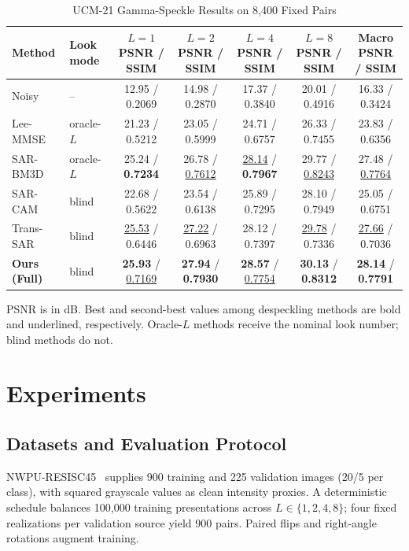 \documentclass[journal]{IEEEtran}
\begin{document}
\begin{table}[!b]
\caption{UCM-21 Gamma-Speckle Results on 8,400 Fixed Pairs}
\label{tab:main}
\centering
\footnotesize
\setlength{\tabcolsep}{3.2pt}
\renewcommand{\arraystretch}{1.08}
\begin{tabular*}{0.86\textwidth}{@{\extracolsep{\fill}}llccccc@{}}
\toprule
\textbf{Method} & \textbf{Look mode} &
\shortstack{\(L=1\)\\PSNR / SSIM} &
\shortstack{\(L=2\)\\PSNR / SSIM} &
\shortstack{\(L=4\)\\PSNR / SSIM} &
\shortstack{\(L=8\)\\PSNR / SSIM} &
\shortstack{Macro\\PSNR / SSIM} \\
\midrule
Noisy       & --                & 12.95 / 0.2069 & 14.98 / 0.2870 & 17.37 / 0.3840 & 20.01 / 0.4916 & 16.33 / 0.3424 \\
Lee-MMSE    & oracle-\(L\)      & 21.23 / 0.5212 & 23.05 / 0.5999 & 24.71 / 0.6757 & 26.33 / 0.7455 & 23.83 / 0.6356 \\
SAR-BM3D    & oracle-\(L\)      & 25.24 / \textbf{0.7234} & 26.78 / \underline{0.7612} & \underline{28.14} / \textbf{0.7967} & 29.77 / \underline{0.8243} & 27.48 / \underline{0.7764} \\
SAR-CAM     & blind             & 22.68 / 0.5622 & 23.54 / 0.6138 & 25.89 / 0.7295 & 28.10 / 0.7949 & 25.05 / 0.6751 \\
Trans-SAR   & blind             & \underline{25.53} / 0.6446 & \underline{27.22} / 0.6963 & 28.12 / 0.7397 & \underline{29.78} / 0.7336 & \underline{27.66} / 0.7036 \\
\textbf{Ours (Full)} & blind    & \textbf{25.93} / \underline{0.7169} & \textbf{27.94} / \textbf{0.7930} & \textbf{28.57} / \underline{0.7754} & \textbf{30.13} / \textbf{0.8312} & \textbf{28.14} / \textbf{0.7791} \\
\bottomrule
\end{tabular*}
\vspace{1pt}
\parbox{0.86\textwidth}{\footnotesize PSNR is in dB. Best and second-best values among despeckling methods are bold and underlined, respectively. Oracle-\(L\) methods receive the nominal look number; blind methods do not.}
\end{table}

\section{Experiments}
\subsection{Datasets and Evaluation Protocol}
NWPU-RESISC45~\cite{cheng2017} supplies 900 training and 225 validation images (20/5 per class), with squared grayscale values as clean intensity proxies. A deterministic schedule balances 100,000 training presentations across \(L\in\{1,2,4,8\}\); four fixed realizations per validation source yield 900 pairs. Paired flips and right-angle rotations augment training.
\end{document}

